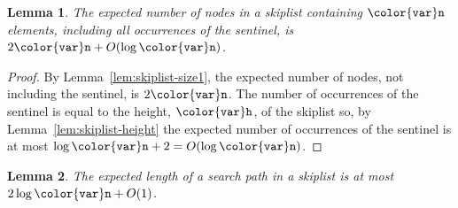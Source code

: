 \documentclass[10pt]{book}
\theoremstyle{plain}
\newtheorem{lem}{Lemma}[chapter]
\newcommand{\lemlabel}[1]{\label{lem:#1}}
\newcommand{\lemref}[1]{Lemma~\ref{lem:#1}}
\theoremstyle{definition}
\begin{document}
\begin{lem}\lemlabel{skiplist-size2}
  The expected number of nodes in a skiplist containing $\ensuremath{\mathtt{{\color{var}n}}}$ elements,
  including all occurrences of the sentinel, is $2\ensuremath{\mathtt{{\color{var}n}}}+O(\log \ensuremath{\mathtt{{\color{var}n}}})$.
\end{lem}

\begin{proof}
  By \lemref{skiplist-size1}, the expected number of nodes, not
  including the sentinel, is $2\ensuremath{\mathtt{{\color{var}n}}}$.  The number of occurrences of
  the sentinel is equal to the height, $\ensuremath{\mathtt{{\color{var}h}}}$, of the skiplist so, by
  \lemref{skiplist-height} the expected number of occurrences of the
  sentinel is at most $\log \ensuremath{\mathtt{{\color{var}n}}}+2 = O(\log \ensuremath{\mathtt{{\color{var}n}}})$.
\end{proof}



\begin{lem}
The expected length of a search path in a skiplist is at most $2\log \ensuremath{\mathtt{{\color{var}n}}} + O(1)$.
\end{lem}
\end{document}

